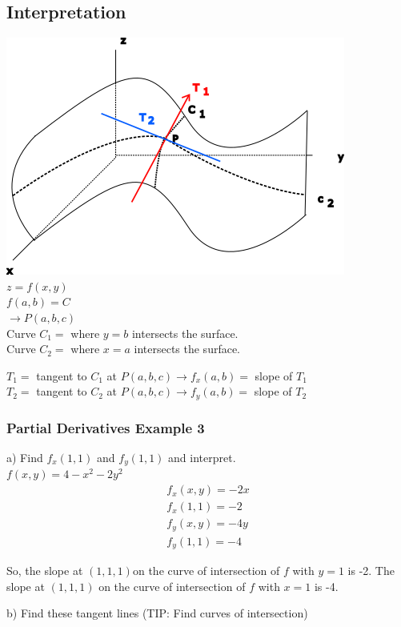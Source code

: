 \documentclass[12pt]{article}
\begin{document}
\subsection{Interpretation}
\includegraphics{partialderivativeslopes}\\
\(z=f(x,y)\)\\
\(f(a,b) = C\)\\
\(\rightarrow P(a,b,c)\)
\bigskip\\
Curve \(C_1 =\) where \(y=b\) intersects the surface. \\%
Curve \(C_2 = \) where \(x = a\) intersects the surface.

\(T_1=\) tangent to \(C_1\) at \(P(a,b,c)\rightarrow f_x(a,b) =\) slope of \(T_1\)\\%
\(T_2=\) tangent to \(C_2\) at \(P(a,b,c)\rightarrow f_y(a,b) =\) slope of \(T_2\)

\subsubsection{Partial Derivatives Example 3}
a) Find \(f_x(1,1)\)  and \(f_y(1,1)\) and interpret.\\
\(f(x,y) = 4-x^2-2y^2\) 
\begin{align}
	f_x(x,y) = -2x\\
	f_x(1,1) = -2\\
	f_y(x,y) = -4y\\
	f_y(1,1) = -4
\end{align}

So, the slope at \((1,1,1)\)on the curve of intersection of \(f\) with \(y=1\) is -2.
The slope at \((1,1,1)\) on the curve of intersection of \(f\) with \(x=1\) is -4.

b) Find these tangent lines (TIP: Find curves of intersection)
\end{document}
